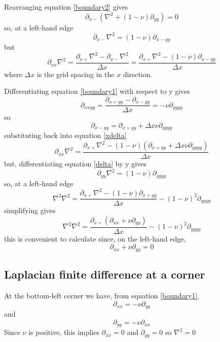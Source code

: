 \documentclass[a4paper]{article}
\begin{document}
Rearranging equation \ref{boundary2} gives
\[
\partial_{x-}(\nabla^2 + (1-\nu)\partial_{yy}) = 0
\]
so, at a left-hand edge
\begin{equation}
\partial_{x-}\nabla^2 = (1-\nu)\partial_{x-yy}
\end{equation}
but
\begin{equation}
\partial_{xx}\nabla^2 = \frac{\partial_{x+}\nabla^2 - \partial_{x-}\nabla^2}{\Delta x} = \frac{\partial_{x+}\nabla^2 - (1-\nu)\partial_{x-yy}}{\Delta x}
\label{xdelta}
\end{equation}
where $\Delta x$ is the grid spacing in the $x$ direction.

Differentiating equation \ref{boundary1} with respect to y gives
\[
\partial_{xxyy} = \frac{\partial_{x+yy} - \partial_{x-yy}}{\Delta x}= -\nu\partial_{yyyy}
\]
so
\[
\partial_{x-yy} = \partial_{x+yy} + \Delta x\nu\partial_{yyyy}
\]
substituting back into equation \ref{xdelta}
\[
\partial_{xx}\nabla^2 = \frac{\partial_{x+}\nabla^2 -(1-\nu)(\partial_{x+yy} + \Delta x\nu\partial_{yyyy})}{\Delta x}
\]
but, differentiating equation \ref{delta} by y gives
\[
\partial_{yy}\nabla^2 = (1-\nu)\partial_{yyyy}
\]
so, at a left-hand edge
\begin{equation}
\nabla^2\nabla^2 = \frac{\partial_{x+}\nabla^2 -(1-\nu)\partial_{x+yy}}{\Delta x} - (1-\nu)^2\partial_{yyyy}
\end{equation}
simplifying gives
\begin{equation}
\nabla^2\nabla^2 = \frac{\partial_{x+}(\partial_{xx} +\nu\partial_{yy})}{\Delta x} - (1-\nu)^2\partial_{yyyy}
\label{DeltaDelta}
\end{equation}
this is convenient to calculate since, on the left-hand edge,
\[
\partial_{xx} +\nu\partial_{yy} = 0
\]
\subsection{Laplacian finite difference at a corner}
At the bottom-left corner we have, from equation \ref{boundary1},
\[
\partial_{xx} = - \nu \partial_{yy} 
\]
and
\[
\partial_{yy} = - \nu \partial_{xx} 
\]
Since $\nu$ is positive, this implies $\partial_{xx} = 0$ and $\partial_{yy} = 0$ so $\nabla^2 = 0$
\end{document}
